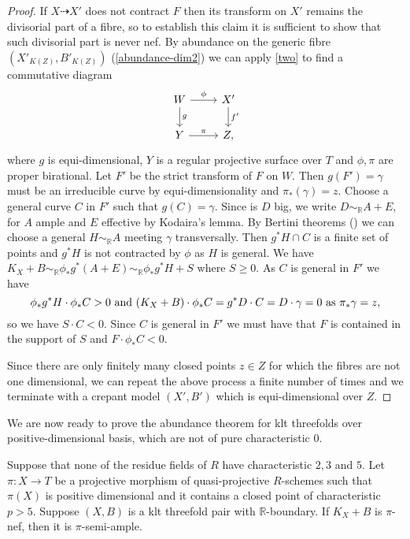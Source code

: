 \begin{proof}
	If $X\dashrightarrow X'$ does not contract $F$ then its transform on $X'$ remains the divisorial part of a fibre, so to establish this claim it is sufficient to show that such divisorial part is never nef. 
	By abundance on the generic fibre $(X'_{K(Z)},B'_{K(Z)})$ (\autoref{abundance-dim2}) we can apply \autoref{two} to find a commutative diagram 
	\[
	\begin{tikzcd}
	W \arrow[d, "g"] \arrow[r, "\phi"] & X' \arrow[d, "f'"]  \\
	Y\arrow[r, "\pi"]           & Z,              
	\end{tikzcd}
	\]
	where $g$ is equi-dimensional, $Y$ is a regular projective surface over $T$ and $\phi, \pi$ are proper birational.
	Let $F'$ be the strict transform of $F$ on $W$. Then $g(F')=\gamma$ must be an irreducible curve by equi-dimensionality and $\pi_*(\gamma)=z$. Choose a general curve $C$ in $F'$ such that $g(C)=\gamma$.
	Since is $D$ big, we write $D\sim_{\mathbb{R}} A+E$, for $A$ ample and $E$ effective by Kodaira's lemma.
	By Bertini theorems (\cite[Theorem 2.15]{bhatt2020}) we can choose a general $H \sim_{\mathbb{R}} A$ meeting $\gamma$ transversally. 
	Then $g^{*}H \cap C$ is a finite set of points and $g^{*}H$ is not contracted by $\phi$ as $H$ is general.
	We have $K_{X}+B \sim_{\mathbb{R}}\phi_{*}g^{*}(A+E) \sim_{\mathbb{R}}\phi_{*}g^{*}H+S$ where $S \geq 0$. As $C$ is general in $F'$ we have
	$$\phi_{*}g^{*}H \cdot \phi_{*}C >0 \textup{ and } (K_{X}+B)\cdot \phi_{*}C=g^{*}D \cdot C=D \cdot \gamma=0 \text{ as } \pi_*\gamma=z,$$ so we have $S \cdot C <0$. Since $C$ is general in $F'$ we must have that $F$ is contained in the support of $S$ and $F \cdot \phi_{*}C <0$.
	
	Since there are only finitely many closed points $z \in Z$ for which the fibres are not one dimensional, we can repeat the above process a finite number of times and we terminate with a crepant model $(X',B')$ which is equi-dimensional over $Z$.	
\end{proof}

We are now ready to prove the abundance theorem for klt threefolds over positive-dimensional basis, which are not of pure characteristic $0$.

\begin{theorem}\label{abundance}
	Suppose that none of the residue fields of $R$ have characteristic $2,3$ and $5$. 
	Let $\pi \colon X \to T$ be a projective morphism of quasi-projective $R$-schemes such that $\pi(X)$ is positive dimensional and it contains a closed point of characteristic $p>5$.
	Suppose $(X,B)$ is a klt threefold pair with $\mathbb{R}$-boundary. If $K_X+B$ is $\pi$-nef, then it is $\pi$-semi-ample.
\end{theorem}

